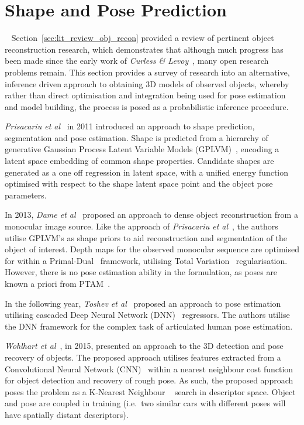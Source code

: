 \section{Shape and Pose Prediction}
~\label{sec:lit_review_prediction}
Section~\ref{sec:lit_review_obj_recon} provided a review of pertinent object reconstruction research, 
which demonstrates that although much progress has been made since the early work of \textit{Curless \& 
Levoy}~\cite{Curless1996}, many open research problems remain. This section provides a survey of research 
into an alternative, inference driven approach to obtaining 3D models of observed 
objects, whereby rather than direct optimisation and integration being used for pose estimation and 
model building, the process is posed as a probabilistic inference procedure.

\textit{Prisacariu et al}~\cite{Prisacariu2011} in 2011 introduced an approach to shape prediction, 
segmentation and pose estimation. Shape is predicted from a hierarchy of generative Gaussian Process 
Latent Variable Models (GPLVM)~\cite{Lawrence2005}, encoding a latent space embedding of common shape 
properties. Candidate shapes are generated as a one off regression in latent space, with a unified 
energy function optimised with respect to the shape latent space point and the object pose parameters.

In 2013, \textit{Dame et al}~\cite{Dame2013} proposed an approach to dense object reconstruction from a 
monocular image source. Like the approach of \textit{Prisacariu et al}~\cite{Prisacariu2011}, the authors 
utilise GPLVM's as shape priors to aid reconstruction and segmentation of the object of interest. Depth maps 
for the observed monocular sequence are optimised for within a Primal-Dual~\cite{Boyd2004Convex} framework, utilising 
Total Variation~\cite{Rudin1992} regularisation. However, there is no pose estimation 
ability in the formulation, as poses are known a priori from PTAM~\cite{Klein2007}.

In the following year, \textit{Toshev et al}~\cite{Toshev2014} proposed an approach to pose estimation 
utilising cascaded Deep Neural Network (DNN)~\cite{LeCun2015} regressors. The authors utilise the DNN 
framework for the complex task of articulated human pose estimation. %

\textit{Wohlhart et al}~\cite{Wohlhart2015}, in 2015, presented an approach to the 3D detection and pose 
recovery of objects. The proposed approach utilises features extracted from a Convolutional Neural 
Network (CNN)~\cite{LeCun2015} within a nearest neighbour cost function for object detection and recovery 
of rough pose. As such, the proposed approach poses the problem as a K-Nearest Neighbour
~\cite{Altman1992} search in descriptor space. Object and pose are coupled in training (i.e.\ two similar 
cars with different poses will have spatially distant descriptors).

